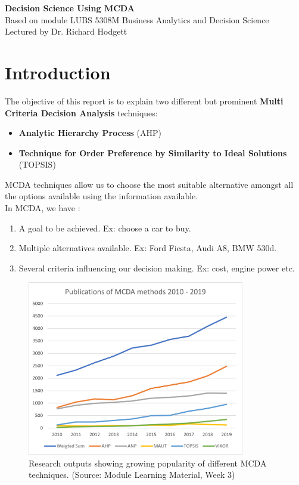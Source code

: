 \documentclass[10pt, a4paper]{article}
\begin{document}
\begin{center}
\textbf{\Large Decision Science Using MCDA} \\
Based on module LUBS 5308M Business Analytics and Decision Science \\
Lectured by Dr. Richard Hodgett \\
\end{center}

\section*{Introduction}
The objective of this report is to explain two different but prominent \textbf{Multi Criteria Decision Analysis} techniques:
\begin{itemize}[noitemsep]
    \item \textbf{Analytic Hierarchy Process }(AHP)
    \item \textbf{Technique for Order Preference by Similarity to Ideal Solutions }(TOPSIS)
\end{itemize}
MCDA techniques allow us to choose the most suitable alternative amongst all the options available using the information available.\\
In MCDA, we have :
\begin{enumerate}[noitemsep]
    \item A goal to be achieved. Ex: choose a car to buy.
    \item Multiple alternatives available. Ex: Ford Fiesta, Audi A8, BMW 530d.
    \item Several criteria influencing our decision making. Ex: cost, engine power etc.
\end{enumerate}
\begin{figure}[h]
	\includegraphics[width=9.5cm]{LUBS5308M Week03 Img001 - MCDA Methods}
	\centering
	\caption{Research outputs showing growing popularity of different MCDA techniques. (Source: Module Learning Material, Week 3)}
    \end{figure}
\end{document}
